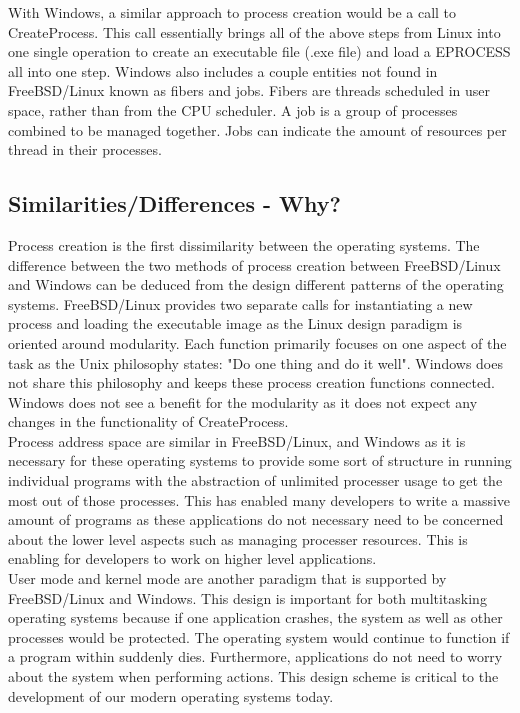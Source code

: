 \documentclass[letterpaper,10pt,titlepage]{article}
\begin{document}
With Windows, a similar approach to process creation would be a call to CreateProcess.  This call essentially brings all of the above steps from Linux into one single operation to create an executable file (.exe file) and load a EPROCESS all into one step.\cite{mwi5}  Windows also includes a couple entities not found in FreeBSD/Linux known as fibers and jobs.  Fibers are threads scheduled in user space, rather than from the CPU scheduler.  A job is a group of processes combined to be managed together.  Jobs can indicate the amount of resources per thread in their processes.

\subsection{Similarities/Differences - Why?}

Process creation is the first dissimilarity between the operating systems.  The difference between the two methods of process creation between FreeBSD/Linux and Windows can be deduced from the design different patterns of the operating systems.  FreeBSD/Linux provides two separate calls for instantiating a new process and loading the executable image as the Linux design paradigm is oriented around modularity.  Each function primarily focuses on one aspect of the task as the Unix philosophy states: "Do one thing and do it well".\cite{philosophy}  Windows does not share this philosophy and keeps these process creation functions connected.  Windows does not see a benefit for the modularity as it does not expect any changes in the functionality of CreateProcess.\\

Process address space are similar in FreeBSD/Linux, and Windows as it is necessary for these operating systems to provide some sort of structure in running individual programs with the abstraction of unlimited processer usage to get the most out of those processes.  This has enabled many developers to write a massive amount of programs as these applications do not necessary need to be concerned about the lower level aspects such as managing processer resources.  This is enabling for developers to work on higher level applications.\\

User mode and kernel mode are another paradigm that is supported by FreeBSD/Linux and Windows.  This design is important for both multitasking operating systems because if one application crashes, the system as well as other processes would be protected.  The operating system would continue to function if a program within suddenly dies.  Furthermore, applications do not need to worry about the system when performing actions.  This design scheme is critical to the development of our modern operating systems today.\\
\end{document}
